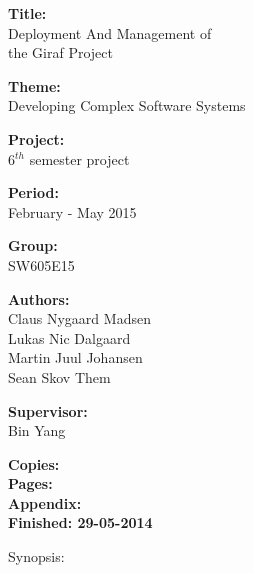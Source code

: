 \begin{minipage}[t]{0.48\textwidth}
\textbf{Title:} \\[5pt]\smallskip\hspace{2ex}
Deployment And Management of\\\bigskip\hspace{2ex}
the Giraf Project

\textbf{Theme:} \\[5pt]\bigskip\hspace{2ex}
Developing Complex Software Systems

\textbf{Project:} \\[5pt]\bigskip\hspace{2ex}
6$^{th}$ semester project

\textbf{Period:} \\[5pt]\bigskip\hspace{2ex}
February - May 2015

\textbf{Group:} \\[5pt]\bigskip\hspace{2ex}
SW605E15	

\textbf{Authors:} \\[5pt]\hspace*{2ex}
Claus Nygaard Madsen\\\hspace*{2ex}
Lukas Nic Dalgaard \\\hspace*{2ex}
Martin Juul Johansen \\\hspace*{2ex}
Sean Skov Them \\\hspace*{2ex}

\textbf{Supervisor:} \\[5pt]\hspace*{2ex}
Bin Yang \\\bigskip\hspace{2ex}

\textbf{Copies: } \\
\textbf{Pages: } \\
\textbf{Appendix: } \\ 
\textbf{Finished: 29-05-2014}

\end{minipage}
\hfill
\begin{minipage}[t]{0.5\textwidth}
\vspace{1cm}
Synopsis: \\[5pt]
\fbox{\parbox{7cm}{\bigskip\bigskip}} %
\end{minipage}

